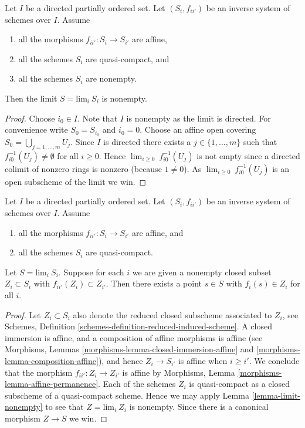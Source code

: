 \begin{lemma}
\label{lemma-limit-nonempty}
Let $I$ be a directed partially ordered set.
Let $(S_i, f_{ii'})$ be an inverse system of
schemes over $I$. Assume
\begin{enumerate}
\item all the morphisms $f_{ii'} : S_i \to S_{i'}$ are affine,
\item all the schemes $S_i$ are quasi-compact, and
\item all the schemes $S_i$ are nonempty.
\end{enumerate}
Then the limit $S = \text{lim}_i\ S_i$ is nonempty.
\end{lemma}

\begin{proof}
Choose $i_0 \in I$. Note that $I$ is nonempty as the limit is directed.
For convenience write $S_0 = S_{i_0}$ and $i_0 = 0$.
Choose an affine open covering $S_0 = \bigcup_{j = 1, \ldots, m} U_j$.
Since $I$ is directed there exists a $j \in \{1, \ldots, m\}$
such that $f_{i0}^{-1}(U_j) \not = \emptyset$ for all
$i \geq 0$. Hence $\lim_{i \geq 0}\ f_{i0}^{-1}(U_j)$ is not
empty since a directed colimit of nonzero rings is nonzero
(because $1 \not = 0$). As $\lim_{i \geq 0}\ f_{i0}^{-1}(U_j)$
is an open subscheme of the limit we win.
\end{proof}

\begin{lemma}
\label{lemma-limit-closed-nonempty}
Let $I$ be a directed partially ordered set.
Let $(S_i, f_{ii'})$ be an inverse system of
schemes over $I$. Assume
\begin{enumerate}
\item all the morphisms $f_{ii'} : S_i \to S_{i'}$ are affine, and
\item all the schemes $S_i$ are quasi-compact.
\end{enumerate}
Let $S = \text{lim}_i\ S_i$.
Suppose for each $i$ we are given a nonempty closed subset
$Z_i \subset S_i$ with $f_{ii'}(Z_i) \subset Z_{i'}$.
Then there exists a point $s \in S$ with $f_i(s) \in Z_i$ for
all $i$.
\end{lemma}

\begin{proof}
Let $Z_i \subset S_i$ also denote the reduced closed subscheme
associated to $Z_i$, see Schemes,
Definition \ref{schemes-definition-reduced-induced-scheme}.
A closed immersion is affine, and a composition of affine
morphisms is affine (see
Morphisms, Lemmas \ref{morphisms-lemma-closed-immersion-affine}
and \ref{morphisms-lemma-composition-affine}), and hence $Z_i \to S_{i'}$ is
affine when $i \geq i'$. We conclude that the morphism
$f_{ii'} : Z_i \to Z_{i'}$ is affine by
Morphisms, Lemma \ref{morphisms-lemma-affine-permanence}.
Each of the schemes $Z_i$ is quasi-compact as a closed
subscheme of a quasi-compact scheme. Hence we may apply
Lemma \ref{lemma-limit-nonempty} to see that
$Z = \text{lim}_i\ Z_i$ is nonempty. Since there is a
canonical morphism $Z \to S$ we win.
\end{proof}

